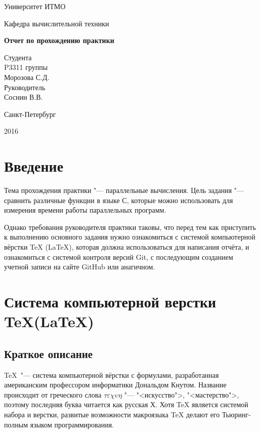 \documentclass{article}
\author{Морозов С.Д.}
\begin{document}
\begin{titlepage}
	\centering
	{\LARGE Университет ИТМО \par}
	\vspace{5mm}
	{\Large Кафедра вычислительной техники\par}
	\vspace{1.5cm}
	{\huge\bfseries Отчет по прохождению практики\par}
	\vspace{3cm}
	\begin{flushleft}
		\hangindent=10cm
		\noindent 
		{\Large Студента\\
				P3311 группы \\
				Морозова С.Д.\\
				Руководитель \\
				Соснин В.В.
		}
	\end{flushleft}
	\vfill
	\vspace{1cm}
	{\large Санкт-Петербург \par}
	{\large 2016  \par}
\end{titlepage}
	\setcounter{tocdepth}{3}	
	\tableofcontents
	\newpage
	\section{Введение}
	\indent 
		Тема прохождения практики "--- параллельные вычисления. Цель задания "--- сравнить различные функции в языке С, которые 		можно использовать для измерения времени работы параллельных программ.
		
		Однако требования руководителя практики таковы, что перед тем как приступить к выполнению основного задания нужно 				ознакомиться с системой компьютерной вёрстки TeX (LaTeX), которая должна
	использоваться для написания отчёта, и ознакомиться с системой контроля версий Git, с последующим созданием учетной записи на 	сайте GitHub или анагичном.
	\newpage
	\section{Система компьютерной верстки \TeX(\LaTeX)}	
		\subsection{Краткое описание}
			\TeX ~"--- система компьютерной вёрстки с формулами, разработанная американским профессором информатики Дональдом 				Кнутом. Название происходит от греческого слова $\tau\varepsilon\chi\upsilon\eta$ "--- "<искусство">, "<мастерство">, 				поэтому	последняя буква читается как русская Х. Хотя TeX является системой набора и верстки, развитые возможности 					макроязыка TeX делают его Тьюринг-полным языком программирования. 
		
\end{document}
